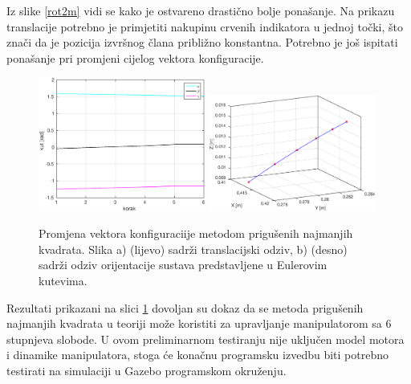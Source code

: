 \documentclass[times, utf8, diplomski, numeric]{fer}
\begin{document}
Iz slike \ref{rot2m} vidi se kako je ostvareno drastično bolje ponašanje.
Na prikazu translacije potrebno je primjetiti nakupinu crvenih indikatora u jednoj točki, što znači da je pozicija izvršnog člana približno konstantna.
Potrebno je još ispitati ponašanje pri promjeni cijelog vektora konfiguracije.
\begin{figure}[h!]
\centering
\includegraphics[width = 0.49\textwidth]{matlab_pravocrtno2}
\includegraphics[width = 0.49\textwidth]{matlab_pravocrtno2_kut}
\caption{Promjena vektora konfiguraciije metodom prigušenih najmanjih kvadrata.
Slika a) (lijevo) sadrži translacijski odziv, b) (desno) sadrži odziv orijentacije sustava predstavljene u Eulerovim kutevima.} \label{PPI}
\end{figure}

Rezultati prikazani na slici \ref{PPI} dovoljan su dokaz da se metoda prigušenih najmanjih kvadrata u teoriji može koristiti za upravljanje manipulatorom sa 6 stupnjeva slobode.
U ovom preliminarnom testiranju nije uključen model motora i dinamike manipulatora, stoga će konačnu programsku izvedbu biti potrebno testirati na simulaciji u Gazebo programskom okruženju.
\end{document}
